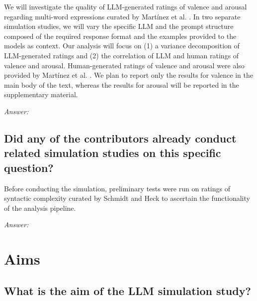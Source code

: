 \documentclass[12pt]{article}
\begin{document}
	\begin{examplebox}
		We will investigate the quality of LLM-generated ratings of valence and arousal regarding multi-word expressions curated by Martínez et al. \parencite*{martinezUsingLargeLanguage2024}. In two separate simulation studies, we will vary the specific LLM and the prompt structure composed of the required response format and the examples provided to the models as context. Our analysis will focus on (1) a variance decomposition of LLM-generated ratings and (2) the correlation of LLM and human ratings of valence and arousal. Human-generated ratings of valence and arousal were also provided by Martínez et al. \parencite*{martinezUsingLargeLanguage2024}. We plan to report only the results for valence in the main body of the text, whereas the results for arousal will be reported in the supplementary material.   
	\end{examplebox}
	
	\textit{Answer:}
	
	\subsection{Did any of the contributors already conduct related simulation studies on this specific question?}
	
	
	\begin{examplebox}
		Before conducting the simulation, preliminary tests were run on ratings of syntactic complexity curated by Schmidt and Heck \parencite*{schmidtRelevanceSyntacticComplexity2024} to ascertain the functionality of the analysis pipeline.
	\end{examplebox}
	
	\textit{Answer:}
	
	\section{Aims}
	\subsection{What is the aim of the LLM simulation study?}
	
\end{document}
